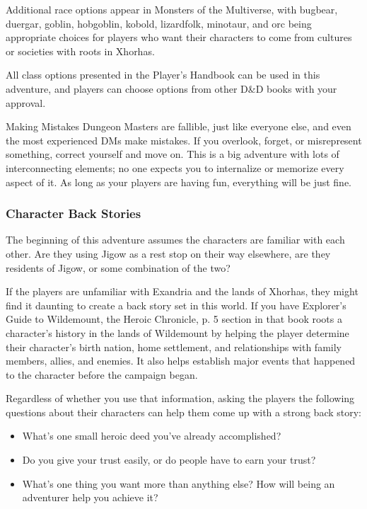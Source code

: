\documentclass[letterpaper, 11pt, bg=full, twocolumn]{dndbook}
\begin{document}
Additional race options appear in Monsters of the Multiverse, with bugbear, duergar, goblin, hobgoblin, kobold, lizardfolk, minotaur, and orc being appropriate choices for players who want their characters to come from cultures or societies with roots in Xhorhas.

All class options presented in the Player's Handbook can be used in this adventure, and players can choose options from other D\&D books with your approval.

\begin{DndSidebar}{Making Mistakes}
Dungeon Masters are fallible, just like everyone else, and even the most experienced DMs make mistakes. If you overlook, forget, or misrepresent something, correct yourself and move on. This is a big adventure with lots of interconnecting elements; no one expects you to internalize or memorize every aspect of it. As long as your players are having fun, everything will be just fine.
\end{DndSidebar}

\subsubsection{Character Back Stories}

The beginning of this adventure assumes the characters are familiar with each other. Are they using Jigow as a rest stop on their way elsewhere, are they residents of Jigow, or some combination of the two?

If the players are unfamiliar with Exandria and the lands of Xhorhas, they might find it daunting to create a back story set in this world. If you have Explorer's Guide to Wildemount, the Heroic Chronicle, p. 5 section in that book roots a character's history in the lands of Wildemount by helping the player determine their character's birth nation, home settlement, and relationships with family members, allies, and enemies. It also helps establish major events that happened to the character before the campaign began.

Regardless of whether you use that information, asking the players the following questions about their characters can help them come up with a strong back story:

\begin{itemize}
\item What's one small heroic deed you've already accomplished?
\item Do you give your trust easily, or do people have to earn your trust?
\item What's one thing you want more than anything else? How will being an adventurer help you achieve it?
\end{itemize}
\end{document}
